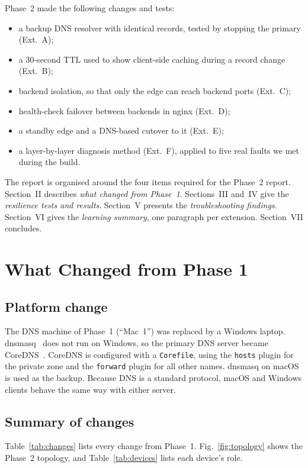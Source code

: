 \documentclass[conference]{IEEEtran}
\begin{document}
Phase~2 made the following changes and tests:
\begin{itemize}
\item a backup DNS resolver with identical records, tested by stopping the primary (Ext.~A);
\item a 30-second TTL used to show client-side caching during a record change (Ext.~B);
\item backend isolation, so that only the edge can reach backend ports (Ext.~C);
\item health-check failover between backends in nginx (Ext.~D);
\item a standby edge and a DNS-based cutover to it (Ext.~E);
\item a layer-by-layer diagnosis method (Ext.~F), applied to five real faults we met during the build.
\end{itemize}

The report is organised around the four items required for the Phase~2 report. Section~II describes \emph{what changed from Phase~1}. Sections~III and~IV give the \emph{resilience tests and results}. Section~V presents the \emph{troubleshooting findings}. Section~VI gives the \emph{learning summary}, one paragraph per extension. Section~VII concludes.

\section{What Changed from Phase 1}

\subsection{Platform change}
The DNS machine of Phase~1 (``Mac~1'') was replaced by a Windows laptop. dnsmasq~\cite{dnsmasq} does not run on Windows, so the primary DNS server became CoreDNS~\cite{coredns}. CoreDNS is configured with a \texttt{Corefile}, using the \texttt{hosts} plugin for the private zone and the \texttt{forward} plugin for all other names. dnsmasq on macOS is used as the backup. Because DNS is a standard protocol, macOS and Windows clients behave the same way with either server.

\subsection{Summary of changes}
Table~\ref{tab:changes} lists every change from Phase~1. Fig.~\ref{fig:topology} shows the Phase~2 topology, and Table~\ref{tab:devices} lists each device's role.
\end{document}
